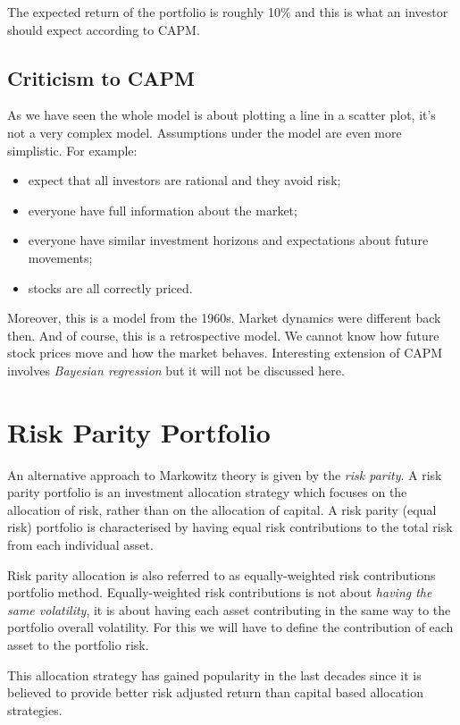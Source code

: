 The expected return of the portfolio is roughly 10\% and this is what an investor should expect according to CAPM.

\subsection{Criticism to CAPM}
As we have seen the whole model is about plotting a line in a scatter plot, it’s not a very complex model. Assumptions under the model are even more simplistic. For example:
\begin{itemize}
\tightlist
\item expect that all investors are rational and they avoid risk;
\item everyone have full information about the market;
\item everyone have similar investment horizons and expectations about future movements;
\item stocks are all correctly priced.
\end{itemize}

Moreover, this is a model from the 1960s. Market dynamics were different back then. And of course, this is a retrospective model. We cannot know how future stock prices move and how the market behaves.
Interesting extension of CAPM involves \emph{Bayesian regression} but it will not be discussed here.

\section{Risk Parity Portfolio}
\label{risk-parity-portfolio}

An alternative approach to Markowitz theory is given by the
\emph{risk parity}. A risk parity portfolio is an investment allocation
strategy which focuses on the allocation of risk, rather than on the
allocation of capital. 
A risk parity (equal risk) portfolio is characterised by having equal risk contributions to the total risk from each individual asset. 

Risk parity allocation is also referred to as equally-weighted risk
contributions portfolio method. Equally-weighted risk contributions is
not about \emph{having the same volatility}, it is about having each
asset contributing in the same way to the portfolio overall volatility.
For this we will have to define the contribution of each asset to the
portfolio risk. 

This allocation strategy has gained popularity in the
last decades since it is believed to provide better risk adjusted return
than capital based allocation strategies.

